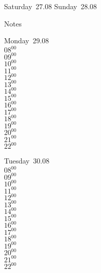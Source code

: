 \documentclass[11pt,a4paper]{book}\usepackage[]{graphicx}\usepackage[]{color}
\begin{document}
\begin{weekendbox}
  Saturday~27.08
  \tcblower
  Sunday~28.08
\end{weekendbox} %
\begin{notebox}
  Notes
\end{notebox}
\clearpage
\begin{headerbox}
\end{headerbox}
\begin{weekdaybox}
  Monday~29.08\\
  { 
  \vfill
  $08^{00}$\\
$09^{00}$\\
$10^{00}$\\
$11^{00}$\\
$12^{00}$\\
$13^{00}$\\
$14^{00}$\\
$15^{00}$\\
$16^{00}$\\
$17^{00}$\\
$18^{00}$\\
$19^{00}$\\
$20^{00}$\\
$21^{00}$\\
$22^{00}$\\
  }
\end{weekdaybox}
\begin{weekdaybox}
  Tuesday~30.08\\
  { 
  \vfill
  $08^{00}$\\
$09^{00}$\\
$10^{00}$\\
$11^{00}$\\
$12^{00}$\\
$13^{00}$\\
$14^{00}$\\
$15^{00}$\\
$16^{00}$\\
$17^{00}$\\
$18^{00}$\\
$19^{00}$\\
$20^{00}$\\
$21^{00}$\\
$22^{00}$\\
  }
\end{weekdaybox}
\end{document}
